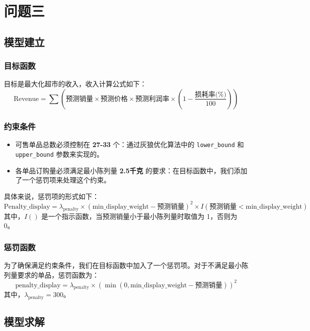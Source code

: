 \documentclass[withoutpreface,bwprint]{cumcmthesis} %
\begin{document}
\section{问题三}
\subsection{模型建立}

\subsubsection{目标函数}
目标是最大化超市的收入，收入计算公式如下：
\[
\text{Revenue} = \sum \left( \text{预测销量} \times \text{预测价格} \times \text{预测利润率} \times \left(1 - \frac{\text{损耗率(\%)}}{100}\right) \right)
\]

\subsubsection{约束条件}

\begin{itemize}
    \item 可售单品总数必须控制在 \textbf{27-33} 个：通过灰狼优化算法中的 \texttt{lower\_bound} 和 \texttt{upper\_bound} 参数来实现的。
    \item 各单品订购量必须满足最小陈列量 \textbf{2.5千克} 的要求：在目标函数中，我们添加了一个惩罚项来处理这个约束。
\end{itemize}

具体来说，惩罚项的形式如下：
\[
\text{Penalty\_display} = \lambda_{\text{penalty}} \times \left( \text{min\_display\_weight} - \text{预测销量} \right)^2 \times I\left( \text{预测销量} < \text{min\_display\_weight} \right)
\]
其中，\( I() \) 是一个指示函数，当预测销量小于最小陈列量时取值为 1，否则为 0。


\subsubsection{惩罚函数}
为了确保满足约束条件，我们在目标函数中加入了一个惩罚项。对于不满足最小陈列量要求的单品，惩罚函数为：
\[
\text{penalty\_display} = \lambda_{\text{penalty}} \times \left(\min(0, \text{min\_display\_weight} - \text{预测销量})\right)^2
\]
其中，\(\lambda_{\text{penalty}} = 300\)。

\subsection{模型求解}
\end{document}

